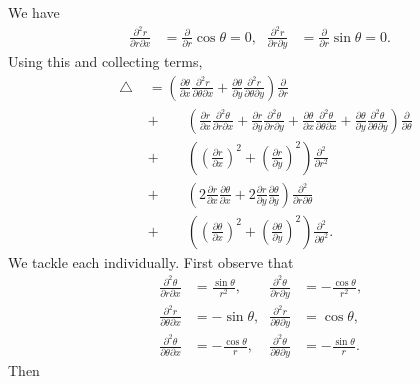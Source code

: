 \documentclass[oneside]{article}
\newcommand*\Laplace{\mathop{}\!\mathbin\bigtriangleup}
\begin{document}
\begin{itemize}
We have \begin{align*}
  \frac{\partial^2 r}{\partial r\partial x}
  &= \frac{\partial}{\partial r}\cos\theta = 0\text{,}&
  \frac{\partial^2 r}{\partial r\partial y}
  &= \frac{\partial}{\partial r}\sin\theta = 0\text{.}
\end{align*} Using this and collecting terms,\begin{align*}
  \Laplace
  &=
  \left(\frac{\partial\theta}{\partial x}
        \frac{\partial^2 r}{\partial\theta\partial x}
        + \frac{\partial\theta}{\partial y}
           \frac{\partial^2 r}{\partial\theta\partial y}
  \right)\frac{\partial}{\partial r} \\
  &+\qquad\left(
      \frac{\partial r}{\partial x}
      \frac{\partial^2 \theta}{\partial r\partial x}
    + \frac{\partial r}{\partial y}
      \frac{\partial^2 \theta}{\partial r\partial y}
    + \frac{\partial\theta}{\partial x}
        \frac{\partial^2 \theta}{\partial\theta\partial x}
    + \frac{\partial\theta}{\partial y}
      \frac{\partial^2 \theta}{\partial\theta\partial y}
    \right)\frac{\partial}{\partial\theta} \\
  &+\qquad \left(
       \left(\frac{\partial r}{\partial x}\right)^2
       + \left(\frac{\partial r}{\partial y}\right)^2
      \right)\frac{\partial^2}{\partial r^2} \\
  &+\qquad \left(
    2\frac{\partial r}{\partial x}\frac{\partial\theta}{\partial x}
    + 2\frac{\partial r}{\partial y}\frac{\partial\theta}{\partial y}
    \right)\frac{\partial^2}{\partial r\partial\theta} \\
  &+\qquad \left(
    \left(\frac{\partial\theta}{\partial x}\right)^2
    + \left(\frac{\partial\theta}{\partial y}\right)^2
  \right)\frac{\partial^2}{\partial\theta^2} \text{.}
\end{align*} We tackle each individually. First observe that\begin{align*}
  \frac{\partial^2\theta}{\partial r\partial x}
  &= \frac{\sin\theta}{r^2} \text{,} &
  \frac{\partial^2\theta}{\partial r\partial y}
  &= -\frac{\cos\theta}{r^2} \text{,} \\
  \frac{\partial^2r}{\partial\theta\partial x}
  &= -\sin\theta \text{,} &
  \frac{\partial^2r}{\partial\theta\partial y}
  &= \cos\theta \text{,} \\
  \frac{\partial^2\theta}{\partial\theta\partial x}
  &= -\frac{\cos\theta}{r} \text{,} &
  \frac{\partial^2\theta}{\partial\theta\partial y}
  &= -\frac{\sin\theta}{r} \text{.}
\end{align*} Then

\end{itemize}
\end{document}
